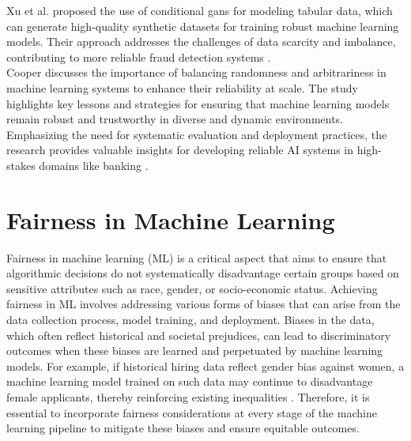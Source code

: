 \documentclass[12pt,a4paper]{report}
\begin{document}
Xu et al. proposed the use of conditional \acrshort{gan}s for modeling tabular data, which can generate high-quality synthetic datasets for training robust machine learning models. Their approach addresses the challenges of data scarcity and imbalance, contributing to more reliable fraud detection systems \citep[p.42]{xu2019modeling}.\\

Cooper discusses the importance of balancing randomness and arbitrariness in machine learning systems to enhance their reliability at scale. The study highlights key lessons and strategies for ensuring that machine learning models remain robust and trustworthy in diverse and dynamic environments. Emphasizing the need for systematic evaluation and deployment practices, the research provides valuable insights for developing reliable AI systems in high-stakes domains like banking \citep{cooper2024between}.

\section{Fairness in Machine Learning}
Fairness in machine learning (ML) is a critical aspect that aims to ensure that algorithmic decisions do not systematically disadvantage certain groups based on sensitive attributes such as race, gender, or socio-economic status. Achieving fairness in ML involves addressing various forms of biases that can arise from the data collection process, model training, and deployment. Biases in the data, which often reflect historical and societal prejudices, can lead to discriminatory outcomes when these biases are learned and perpetuated by machine learning models. For example, if historical hiring data reflect gender bias against women, a machine learning model trained on such data may continue to disadvantage female applicants, thereby reinforcing existing inequalities \citep{barocas2023fairness}. Therefore, it is essential to incorporate fairness considerations at every stage of the machine learning pipeline to mitigate these biases and ensure equitable outcomes.\\
\end{document}
